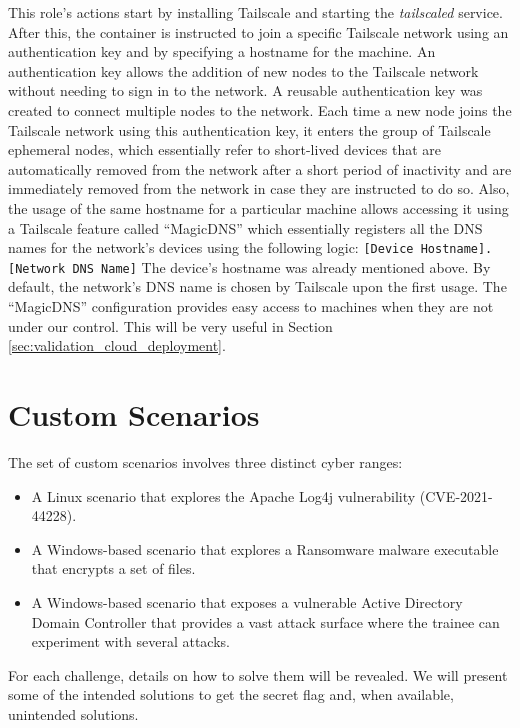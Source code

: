 This role's actions start by installing Tailscale and starting the \textit{tailscaled} service. After this, the container is instructed to join a specific Tailscale network using an authentication key and by specifying a hostname for the machine. An authentication key allows the addition of new nodes to the Tailscale network without needing to sign in to the network. A reusable authentication key was created to connect multiple nodes to the network. Each time a new node joins the Tailscale network using this authentication key, it enters the group of Tailscale ephemeral nodes, which essentially refer to short-lived devices that are automatically removed from the network after a short period of inactivity and are immediately removed from the network in case they are instructed to do so. Also, the usage of the same hostname for a particular machine allows accessing it using a Tailscale feature called ``MagicDNS'' which essentially registers all the DNS names for the network's devices using the following logic: \texttt{[Device Hostname].[Network DNS Name]}
The device's hostname was already mentioned above. By default, the network's DNS name is chosen by Tailscale upon the first usage. The ``MagicDNS'' configuration provides easy access to machines when they are not under our control. This will be very useful in Section \ref{sec:validation_cloud_deployment}.

\section{Custom Scenarios} \label{sec:validation_custom_scenarios}

The set of custom scenarios involves three distinct cyber ranges:

\begin{itemize}
    \item A Linux scenario that explores the Apache Log4j vulnerability (CVE-2021-44228).
    \item A Windows-based scenario that explores a Ransomware malware executable that encrypts a set of files.
    \item A Windows-based scenario that exposes a vulnerable Active Directory Domain Controller that provides a vast attack surface where the trainee can experiment with several attacks. 
\end{itemize}

For each challenge, details on how to solve them will be revealed. We will present some of the intended solutions to get the secret flag and, when available, unintended solutions.

